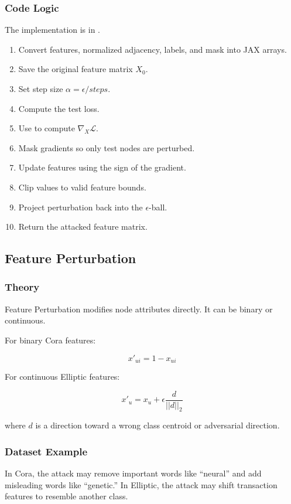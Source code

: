 \documentclass[12pt,a4paper]{article}
\begin{document}
\subsubsection{Code Logic}
The implementation is in .

\begin{enumerate}
    \item Convert features, normalized adjacency, labels, and mask into JAX arrays.
    \item Save the original feature matrix $X_0$.
    \item Set step size $\alpha=\epsilon/steps$.
    \item Compute the test loss.
    \item Use  to compute $\nabla_X\mathcal{L}$.
    \item Mask gradients so only test nodes are perturbed.
    \item Update features using the sign of the gradient.
    \item Clip values to valid feature bounds.
    \item Project perturbation back into the $\epsilon$-ball.
    \item Return the attacked feature matrix.
\end{enumerate}

\subsection{Feature Perturbation}
\subsubsection{Theory}
Feature Perturbation modifies node attributes directly. It can be binary or continuous.

For binary Cora features:

$$
x'_{ui}=1-x_{ui}
$$

For continuous Elliptic features:

$$
x'_u=x_u+\epsilon\frac{d}{||d||_2}
$$

where $d$ is a direction toward a wrong class centroid or adversarial direction.

\subsubsection{Dataset Example}
In Cora, the attack may remove important words like ``neural'' and add misleading words like ``genetic.'' In Elliptic, the attack may shift transaction features to resemble another class.
\end{document}
